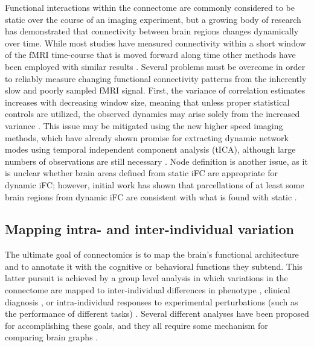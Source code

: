 \documentclass{bmcart}
\begin{document}
Functional interactions within the connectome are commonly considered to be static over the course of an imaging experiment, but a growing body of research has demonstrated that connectivity between brain regions changes dynamically over time\cite{Hutchison2013}. While most studies have measured connectivity within a short window of the fMRI time-course that is moved forward along time \cite{Keilholz2013,Chang2010,Yang2014,Allen2014} other methods have been employed with similar results  \cite{Majeed2011,Smith2012}. Several problems must be overcome in order to reliably measure changing functional connectivity patterns from the inherently slow and poorly sampled fMRI signal. First, the variance of correlation estimates increases with decreasing window size, meaning that unless proper statistical controls are utilized, the observed dynamics may arise solely from the increased variance \cite{Handwerker2012}. This issue may be mitigated using the new higher speed imaging methods, which have already shown promise for extracting dynamic network modes using temporal independent component analysis (tICA), although large numbers of observations are still necessary \cite{Smith2012}. Node definition is another issue, as it is unclear whether brain areas defined from static iFC are appropriate for dynamic iFC; however, initial work has shown that parcellations of at least some brain regions from dynamic iFC are consistent with what is found with static \cite{Yang2014}.

\subsection{Mapping intra- and inter-individual variation} 

The ultimate goal of connectomics is to map the brain's functional architecture and to annotate it with the cognitive or behavioral functions they subtend. This latter pursuit is achieved by a group level analysis in which variations in the connectome are mapped to inter-individual differences in phenotype \cite{Kelly2012}, clinical diagnosis \cite{Castellanos2013}, or intra-individual responses to experimental perturbations (such as the performance of different tasks) \cite{Shirer2012,Krienen2014,Cole2014}. Several different analyses have been proposed for accomplishing these goals, and they all require some mechanism for comparing brain graphs \cite{Varoquaux2013}. 
 
\end{document}
